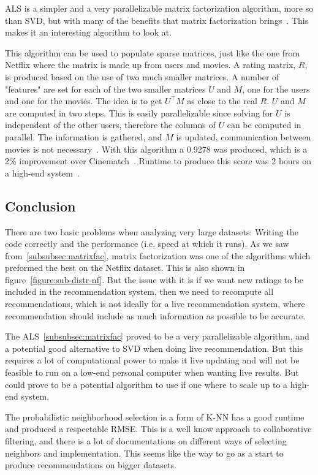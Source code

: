 ALS is a simpler and a very parallelizable matrix factorization algorithm, more so than SVD, but with many of the benefits that matrix factorization brings~\cite{predusingmatrix}. This makes it an interesting algorithm to look at.

This algorithm can be used to populate sparse matrices, just like the one from Netflix where the matrix is made up from users and movies. A rating matrix, $R$, is produced based on the use of two much smaller matrices. A number of "features" are set for each of the two smaller matrices $U$ and $M$, one for the users and one for the movies. The idea is to get $U^\top M$ as close to the real $R$. $U$ and $M$ are computed in two steps. This is easily parallelizable since solving for $U$ is independent of the other users, therefore the columns of $U$ can be computed in parallel. The information is gathered, and $M$ is updated, communication between movies is not necessary~\cite{myrrix}. With this algorithm a 0.9278 was produced, which is a 2\% improvement over Cinematch~\cite{predusingmatrix}. Runtime to produce this score was 2 hours on a high-end system~\cite{alsMPI}.


\subsection{Conclusion}\label{subsec:sim-sys-conc}
There are two basic problems when analyzing very large datasets: Writing the code correctly and the performance (i.e. speed at which it runs). As we saw from~\ref{subsubsec:matrixfac}, matrix factorization was one of the algorithms which preformed the best on the Netflix dataset. This is also shown in figure~\ref{figure:sub-distr-nf}. But the issue with it is if we want new ratings to be included in the recommendation system, then we need to recompute all recommendations, which is not ideally for a live recommendation system, where recommendation should include as much information as possible to be accurate.

The ALS~\ref{subsubsec:matrixfac} proved to be a very parallelizable algorithm, and a potential good alternative to SVD when doing live recommendation. But this requires a lot of computational power to make it live updating and will not be feasible to run on a low-end personal computer when wanting live results. But could prove to be a potential algorithm to use if one where to scale up to a high-end system.

The probabilistic neighborhood selection is a form of K-NN has a good runtime and produced a respectable RMSE. This is a well know approach to collaborative filtering, and there is a lot of documentations on different ways of selecting neighbors and implementation. This seems like the way to go as a start to produce recommendations on bigger datasets.



